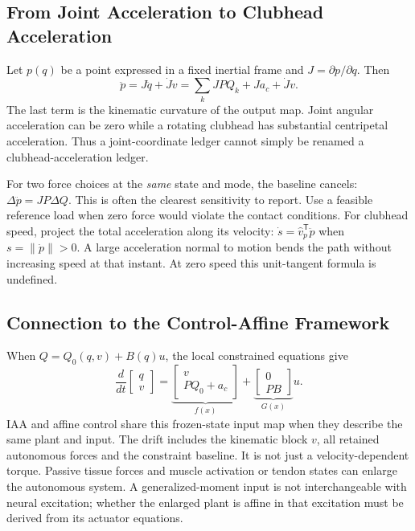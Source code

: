 \subsection{From Joint Acceleration to Clubhead Acceleration}
Let \(p(q)\) be a point expressed in a fixed inertial frame and \(J=\partial p/\partial q\). Then
\[
 \ddot p=J\ddot q+\dot Jv
         =\sum_k JPQ_k+Ja_c+\dot Jv.
\]
The last term is the kinematic curvature of the output map. Joint angular acceleration can be zero while a rotating clubhead has substantial centripetal acceleration. Thus a joint-coordinate ledger cannot simply be renamed a clubhead-acceleration ledger.

For two force choices at the \emph{same} state and mode, the baseline cancels: \(\Delta\ddot p=JP\Delta Q\). This is often the clearest sensitivity to report. Use a feasible reference load when zero force would violate the contact conditions. For clubhead speed, project the total acceleration along its velocity: \(\dot s=\hat v_p^{\mathsf T}\ddot p\) when \(s=\|\dot p\|>0\). A large acceleration normal to motion bends the path without increasing speed at that instant. At zero speed this unit-tangent formula is undefined.

\subsection{Connection to the Control-Affine Framework}
\label{sec:iaa_affine_connection}
When \(Q=Q_0(q,v)+B(q)u\), the local constrained equations give
\[
 \frac{d}{dt}\begin{bmatrix}q\\v\end{bmatrix}
 =\underbrace{\begin{bmatrix}v\\PQ_0+a_c\end{bmatrix}}_{f(x)}
 +\underbrace{\begin{bmatrix}0\\PB\end{bmatrix}}_{G(x)}u.
\]
IAA and affine control share this frozen-state input map when they describe the same plant and input. The drift includes the kinematic block \(v\), all retained autonomous forces and the constraint baseline. It is not just a velocity-dependent torque. Passive tissue forces and muscle activation or tendon states can enlarge the autonomous system. A generalized-moment input is not interchangeable with neural excitation; whether the enlarged plant is affine in that excitation must be derived from its actuator equations.

